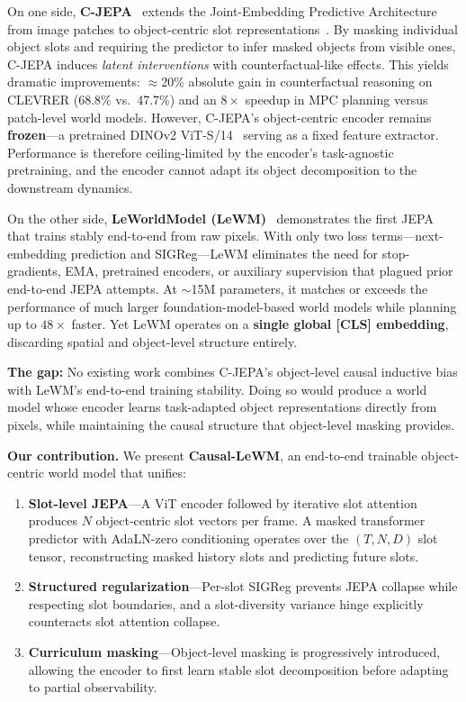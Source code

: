 \documentclass[12pt]{article}
\begin{document}
On one side, \textbf{C-JEPA}~\citep{nam2026cjepa} extends the Joint-Embedding Predictive Architecture~\citep{assran2023ijepa} from image patches to object-centric slot representations~\citep{locatello2020slot}. By masking individual object slots and requiring the predictor to infer masked objects from visible ones, C-JEPA induces \emph{latent interventions} with counterfactual-like effects. This yields dramatic improvements: $\approx$20\% absolute gain in counterfactual reasoning on CLEVRER (68.8\% vs.\ 47.7\%) and an $8\times$ speedup in MPC planning versus patch-level world models. However, C-JEPA's object-centric encoder remains \textbf{frozen}---a pretrained DINOv2 ViT-S/14~\citep{oquab2023dinov2} serving as a fixed feature extractor. Performance is therefore ceiling-limited by the encoder's task-agnostic pretraining, and the encoder cannot adapt its object decomposition to the downstream dynamics.

On the other side, \textbf{LeWorldModel (LeWM)}~\citep{maes2026lewm} demonstrates the first JEPA that trains stably end-to-end from raw pixels. With only two loss terms---next-embedding prediction and SIGReg---LeWM eliminates the need for stop-gradients, EMA, pretrained encoders, or auxiliary supervision that plagued prior end-to-end JEPA attempts. At $\sim$15M parameters, it matches or exceeds the performance of much larger foundation-model-based world models while planning up to $48\times$ faster. Yet LeWM operates on a \textbf{single global [CLS] embedding}, discarding spatial and object-level structure entirely.

\textbf{The gap:} No existing work combines C-JEPA's object-level causal inductive bias with LeWM's end-to-end training stability. Doing so would produce a world model whose encoder learns task-adapted object representations directly from pixels, while maintaining the causal structure that object-level masking provides.

\textbf{Our contribution.} We present \textbf{Causal-LeWM}, an end-to-end trainable object-centric world model that unifies:
\begin{enumerate}[label=(\roman*)]
    \item \textbf{Slot-level JEPA}---A ViT encoder followed by iterative slot attention produces $N$ object-centric slot vectors per frame. A masked transformer predictor with AdaLN-zero conditioning operates over the $(T, N, D)$ slot tensor, reconstructing masked history slots and predicting future slots.
    \item \textbf{Structured regularization}---Per-slot SIGReg prevents JEPA collapse while respecting slot boundaries, and a slot-diversity variance hinge explicitly counteracts slot attention collapse.
    \item \textbf{Curriculum masking}---Object-level masking is progressively introduced, allowing the encoder to first learn stable slot decomposition before adapting to partial observability.
\end{enumerate}
\end{document}
